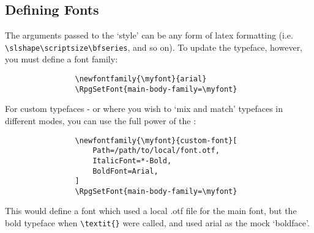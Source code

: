 		\subsection{Defining Fonts}

			The arguments passed to the `style' can be any form of latex formatting (i.e. \verb|\slshape\scriptsize\bfseries|, and so on). To update the typeface, however, you must define a font family:
			\begin{lstlisting}
				\newfontfamily{\myfont}{arial}
				\RpgSetFont{main-body-family=\myfont}
			\end{lstlisting}

			For custom typefaces - or where you wish to `mix and match' typefaces in different modes, you can use the full power of the :
			\begin{lstlisting}
				\newfontfamily{\myfont}{custom-font}[
					Path=/path/to/local/font.otf,
					ItalicFont=*-Bold,
					BoldFont=Arial,
				]
				\RpgSetFont{main-body-family=\myfont}
			\end{lstlisting}
			This would define a font which used a local .otf file for the main font, but the bold typeface when \verb|\textit{}| were called, and used arial as the mock `boldface'.

